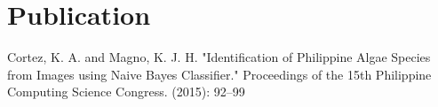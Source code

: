 \documentclass[top=0in]{deedy-resume-openfont}
\begin{document}
\begin{minipage}[t]{0.66\textwidth}
%


\section{Publication}\label{sec:publications}
\renewcommand\refname{\vskip -1.5em} %
Cortez, K. A. and Magno, K. J. H. "Identification of Philippine Algae Species from Images using Naive Bayes Classifier."
Proceedings of the 15th Philippine Computing Science Congress. (2015): 92--99
%
%

\end{minipage} 
\end{document}
